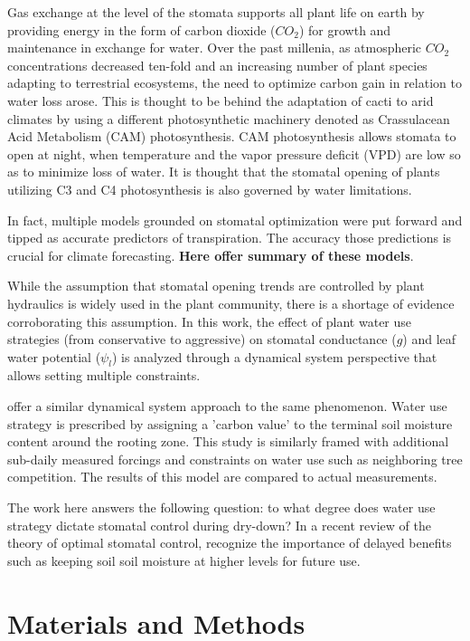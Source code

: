 \documentclass[utf8]{frontiersSCNS} %
\begin{document}
Gas exchange at the level of the stomata supports all plant life on earth by providing energy in the form of carbon dioxide ($CO_2$) for growth and maintenance in exchange for water. Over the past millenia, as atmospheric $CO_2$ concentrations decreased ten-fold and an increasing number of plant species adapting to terrestrial ecosystems, the need to optimize carbon gain in relation to water loss arose. This is thought to be behind the adaptation of cacti to arid climates by using a different photosynthetic machinery denoted as Crassulacean Acid Metabolism (CAM) photosynthesis. CAM photosynthesis allows stomata to open at night, when temperature and the vapor pressure deficit (VPD) are low so as to minimize loss of water. It is thought that the stomatal opening of plants utilizing C3 and C4 photosynthesis is also governed by water limitations.

In fact, multiple models grounded on stomatal optimization were put forward and tipped as accurate predictors of transpiration. The accuracy those predictions is crucial for climate forecasting. \textbf{Here offer summary of these models}.

While the assumption that stomatal opening trends are controlled by plant hydraulics is widely used in the plant community, there is a shortage of evidence corroborating this assumption. In this work, the effect of plant water use strategies (from conservative to aggressive) on stomatal conductance ($g$) and leaf water potential ($\psi_l$) is analyzed through a dynamical system perspective that allows setting multiple constraints. 

\citet{Manzoni2013} offer a similar dynamical system approach to the same phenomenon. Water use strategy is prescribed by assigning a 'carbon value' to the terminal soil moisture content around the rooting zone. This study is similarly framed with additional sub-daily measured forcings and constraints on water use such as neighboring tree competition. The results of this model are compared to actual measurements.

The work here answers the following question: to what degree does water use strategy dictate stomatal control during dry-down? In a recent review of the theory of optimal stomatal control, \citet{Buckley2017} recognize the importance of delayed benefits such as keeping soil soil moisture at higher levels for future use. 

\section{Materials and Methods}
\end{document}
